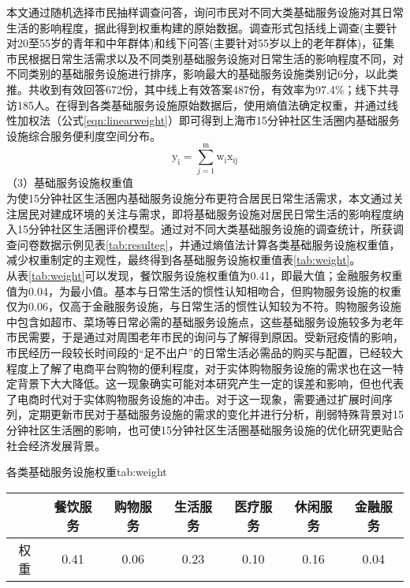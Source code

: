 \documentclass{shnuthesis}
\begin{document}
本文通过随机选择市民抽样调查问答，询问市民对不同大类基础服务设施对其日常生活的影响程度，据此得到权重构建的原始数据。调查形式包括线上调查(主要针对20至55岁的青年和中年群体)和线下问答(主要针对55岁以上的老年群体)，征集市民根据日常生活需求以及不同类别基础服务设施对日常生活的影响程度不同，对不同类别的基础服务设施进行排序，影响最大的基础服务设施类别记6分，以此类推。共收到有效回答672份，其中线上有效答案487份，有效率为97.4\%；线下共寻访185人。在得到各类基础服务设施原始数据后，使用熵值法确定权重，并通过线性加权法（公式\ref{eqn:linearweight}）即可得到上海市15分钟社区生活圈内基础服务设施综合服务便利度空间分布。
\newline
\begin{equation}\label{eqn:linearweight}
	\mathrm{y}_{\mathrm{i}}=\sum_{j=1}^{\mathrm{m}} \mathrm{w}_{\mathrm{i}} \mathrm{x}_{\mathrm{ij}}
\end{equation}
\newline
\indent （3）基础服务设施权重值\\
\indent 为使15分钟社区生活圈内基础服务设施分布更符合居民日常生活需求，本文通过关注居民对建成环境的关注与需求，即将基础服务设施对居民日常生活的影响程度纳入15分钟社区生活圈评价模型。通过对不同大类基础服务设施的调查统计，所获调查问卷数据示例见表\ref{tab:resulteg}，并通过熵值法计算各类基础服务设施权重值，减少权重制定的主观性，最终得到各基础服务设施权重值表\ref{tab:weight}。\\
\indent 从表\ref{tab:weight}可以发现，餐饮服务设施权重值为0.41，即最大值；金融服务权重值为0.04，为最小值。基本与日常生活的惯性认知相吻合，但购物服务设施的权重仅为0.06，仅高于金融服务设施，与日常生活的惯性认知较为不符。购物服务设施中包含如超市、菜场等日常必需的基础服务设施点，这些基础服务设施较多为老年市民需要，于是通过对周围老年市民的询问与了解得到原因。受新冠疫情的影响，市民经历一段较长时间段的“足不出户”的日常生活必需品的购买与配置，已经较大程度上了解了电商平台购物的便利程度，对于实体购物服务设施的需求也在这一特定背景下大大降低。这一现象确实可能对本研究产生一定的误差和影响，但也代表了电商时代对于实体购物服务设施的冲击。对于这一现象，需要通过扩展时间序列，定期更新市民对于基础服务设施的需求的变化并进行分析，削弱特殊背景对15分钟社区生活圈的影响，也可使15分钟社区生活圈基础服务设施的优化研究更贴合社会经济发展背景。

\begin{generaltab}{各类基础服务设施权重}{tab:weight}
	\begin{tabularx}{0.8\textwidth}{ccccccc}
		\toprule[1.5pt]
		 & 餐饮服务 & 购物服务 & 生活服务 & 医疗服务 & 休闲服务 & 金融服务 \\
		\midrule
		权重    & 0.41   & 0.06    & 0.23    & 0.10    & 0.16    & 0.04    \\
		\bottomrule[1.5pt]
	\end{tabularx}
\end{generaltab}
\end{document}
